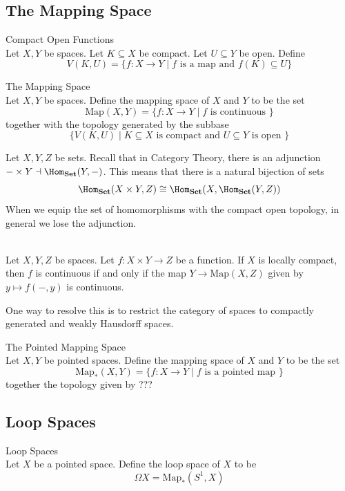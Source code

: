 \documentclass[a4paper]{article}
\begin{document}
\subsection{The Mapping Space}
\begin{defn}{Compact Open Functions}{}\\
Let $X,Y$ be spaces. Let $K\subseteq X$ be compact. Let $U\subseteq Y$ be open. Define $$V(K,U)=\{f:X\to Y\;|\;f\text{ is a map and }f(K)\subseteq U\}$$
\end{defn}

\begin{defn}{The Mapping Space}{}\\
Let $X,Y$ be spaces. Define the mapping space of $X$ and $Y$ to be the set $$\text{Map}(X,Y)=\{f:X\to Y\;|\;f\text{ is continuous }\}$$ together with the topology generated by the subbase $$\{V(K,U)\;|\;K\subseteq X\text{ is compact and }U\subseteq Y\text{ is open }\}$$
\end{defn}

Let $X,Y,Z$ be sets. Recall that in Category Theory, there is an adjunction $-\times Y\dashv\Hom_{\bold{Set}}(Y,-)$. This means that there is a natural bijection of sets $$\Hom_{\bold{Set}}(X\times Y,Z)\cong\Hom_{\bold{Set}}(X,\Hom_{\bold{Set}}(Y,Z))$$ When we equip the set of homomorphisms with the compact open topology, in general we lose the adjunction. 

\begin{prp}{}{}\\
Let $X,Y,Z$ be spaces. Let $f:X\times Y\to Z$ be a function. If $X$ is locally compact, then $f$ is continuous if and only if the map $Y\to\text{Map}(X,Z)$ given by $y\mapsto f(-,y)$ is continuous. 
\end{prp}

One way to resolve this is to restrict the category of spaces to compactly generated and weakly Hausdorff spaces. 

\begin{defn}{The Pointed Mapping Space}{}\\
Let $X,Y$ be pointed spaces. Define the mapping space of $X$ and $Y$ to be the set $$\text{Map}_\ast(X,Y)=\{f:X\to Y\;|\;f\text{ is a pointed map }\}$$ together the topology given by ???
\end{defn}

\subsection{Loop Spaces}
\begin{defn}{Loop Spaces}{}\\
Let $X$ be a pointed space. Define the loop space of $X$ to be $$\Omega X=\text{Map}_\ast(S^1,X)$$
\end{defn}
\end{document}
